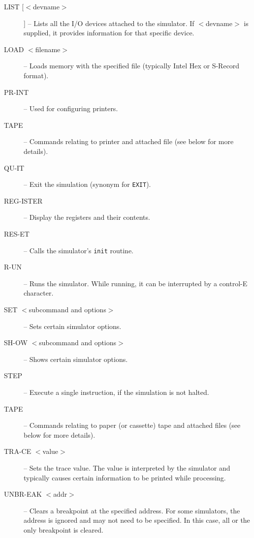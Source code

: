 \documentclass[10pt, openany]{book}
\begin{document}
\begin{description}
  \item[LIST [$<$devname$>$]] -- Lists all the I/O devices attached to the simulator.  If $<$devname$>$ is supplied, it provides information for that specific device.
  \item[LOAD $<$filename$>$] -- Loads memory with the specified file (typically Intel Hex or S-Record format).
  \item[PR-INT] -- Used for configuring printers.
  \item[TAPE] -- Commands relating to printer and attached file (see below for more details).
  \item[QU-IT] -- Exit the simulation (synonym for \verb|EXIT|).
  \item[REG-ISTER] -- Display the registers and their contents.
  \item[RES-ET] -- Calls the simulator's \verb|init| routine.
  \item[R-UN] -- Runs the simulator.  While running, it can be interrupted by a control-E character.
  \item[SET $<$subcommand and options$>$] -- Sets certain simulator options.
  \item[SH-OW $<$subcommand and options$>$] --  Shows certain simulator options.
  \item[STEP] -- Execute a single instruction, if the simulation is not halted.
  \item[TAPE] -- Commands relating to paper (or cassette) tape and attached files (see below for more details).
  \item[TRA-CE $<$value$>$] -- Sets the trace value.  The value is interpreted by the simulator and typically causes certain information to be printed while processing.
  \item[UNBR-EAK $<$addr$>$] -- Clears a breakpoint at the specified address.  For some simulators, the address is ignored and may not need to be specified.  In this case, all or the only breakpoint is cleared.
\end{description}
\end{document}
